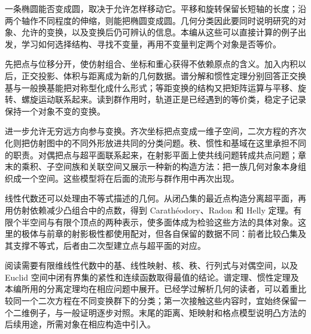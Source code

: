 
% 

\BookPartGuide

一条椭圆能否变成圆，取决于允许怎样移动它。平移和旋转保留长短轴的长度；沿两个轴作不同程度的伸缩，则能把椭圆变成圆。几何分类因此要同时说明研究的对象、允许的变换，以及变换后仍可辨认的信息。本编从这些可以直接计算的例子出发，学习如何选择结构、寻找不变量，再用不变量判定两个对象是否等价。

\ProseParagraphBreak

先把点与位移分开，使仿射组合、坐标和重心获得不依赖原点的含义。加入内积以后，正交投影、体积与距离成为新的几何数据。谱分解和惯性定理分别回答正交换基与一般换基能把对称型化成什么形式；等距变换的结构又把矩阵运算与平移、旋转、螺旋运动联系起来。读到群作用时，轨道正是已经遇到的等价类，稳定子记录保持一个对象不变的变换。

\ProseParagraphBreak

进一步允许无穷远方向参与变换。齐次坐标把点变成一维子空间，二次方程的齐次化则把仿射图中的不同外形放进共同的分类问题。秩、惯性和基域在这里承担不同的职责。对偶把点与超平面联系起来，在射影平面上使共线问题转成共点问题；章末的乘积、子空间族和关联空间又展示一种新的构造方法：把一族几何对象本身组织成一个空间。这些模型将在后面的流形与群作用中再次出现。

\ProseParagraphBreak

线性代数还可以处理由不等式描述的几何。从闭凸集的最近点构造分离超平面，再用仿射依赖减少凸组合中的点数，得到 Carathéodory、Radon 和 Helly 定理。有限个半空间与有限个顶点的两种表示，使多面体成为检验这些方法的具体对象。这里的极体与前章的射影极性都使用配对，但各自保留的数据不同：前者比较凸集及其支撑不等式，后者由二次型建立点与超平面的对应。

\ProseParagraphBreak

阅读需要有限维线性代数中的基、线性映射、核、秩、行列式与对偶空间，以及 Euclid 空间中闭有界集的紧性和连续函数取得最值的结论。谱定理、惯性定理及本编所用的分离定理均在相应问题中展开。已经学过解析几何的读者，可以着重比较同一个二次方程在不同变换群下的分类；第一次接触这些内容时，宜始终保留一个二维例子，与一般证明逐步对照。末尾的距离、矩映射和格点模型说明凸方法的后续用途，所需对象在相应构造中引入。




